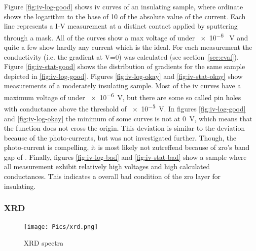 Figure \ref{fig:iv-log-good} shows \gls{iv} curves of an insulating sample, where ordinate shows the logarithm to the base of 10 of the absolute value of the current. 
Each line represents a I-V measurement at a distinct contact applied by sputtering through a mask. 
All of the curves show a max voltage of under \num{e-6} \SI{}{\volt} 
and quite a few show hardly any current which is the ideal. 
For each measurement the conductivity (i.e. the gradient at V=0) was calculated (see section~\ref{sec:eval}). 
Figure \ref{fig:iv-stat-good} shows the distribution of gradients for the same sample depicted in \ref{fig:iv-log-good}.
%
Figures \ref{fig:iv-log-okay} and \ref{fig:iv-stat-okay} show measurements of a moderately insulating sample. 
Most of the \gls{iv} curves have a maximum voltage of under \num{e-6}\SI{}{\volt}, 
but there are some so called pin holes with conductance above the threshold of \num{e-5}\SI{}{\volt}. %
%
In figures \ref{fig:iv-log-good} and \ref{fig:iv-log-okay} the minimum of some curves 
is not at \SI{0}{\volt}, which means that the function does not cross the origin. 
This deviation is similar to the deviation because of the photo-currents\cite{perez2018solar}, 
but was not investigated further. 
Though, the photo-current is compelling, it is most likely not zutreffend because of \gls{zro}'s band gap of \cite{sinhamahapatra2016oxygen}.
%
Finally, figures \ref{fig:iv-log-bad} and \ref{fig:iv-stat-bad} show a sample 
where all measurement exhibit relatively high voltages and high calculated conductances. 
This indicates a overall bad condition of the \gls{zro} layer for insulating. 
%

\subsubsection{XRD}
\begin{figure}
	\centering
	\texttt{[image: Pics/xrd.png]}
	\caption{XRD spectra}
	\label{fig:xrd}
\end{figure}

